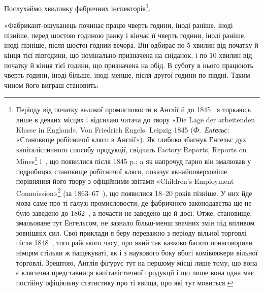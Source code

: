 Послухаймо хвилинку фабричних інспекторів\footnote{
Періоду від початку великої промисловости в Англії й до 1845~
я торкаюсь лише в деяких місцях і відсилаю читача до твору «Die Lage
der arbeitenden Klasse in England», Von Friedrich Engels. Leipzig 1845
(\emph{Ф.~Енґельс}: «Становище робітничої кляси в Англії»). Як глибоко збагнув
Енгельс дух капіталістичного способу продукції, свідчать Factory Reports,
Reports on Mines\footnote*{
— звіти фабричних інспекторів, звіти гірничих інспекторів. \emph{Ред.}
} і~, що появилися після 1845 p.; a як напрочуд
гарно він змалював у подробицях становище робітничої кляси,
показує якнайповерховіше порівняння його твору з офіційними звітами
«Children’s Employment Commission»\footnote*{
— комісії для вивчення праці дітей. \emph{Ред.}
} (за 1863--67~), що появилися
18--20 років пізніше. У них йде мова саме про ті галузі промисловости,
де фабричного законодавства ще не було заведено до 1862~, а почасти не
заведено ще й досі. Отже, становище, змальоване тут Енгельсом, не зазнало
більш-менш значних змін під впливом зовнішніх сил. Свої приклади
я беру переважно з періоду вільної торговлі після 1848~, того райського
часу, про який так казково багато понаговорили німцям стільки ж пащекуваті,
як і з наукового боку вбогі комівояжери вільної торговлі. Зрештою, Англія фігурує тут на першому
місці лише тому, що вона є клясична
представниця капіталістичної продукції і що лише вона одна має
постійну офіціяльну статистику про ті явища, про які тут мовиться.
}.

«Фабрикант-ошуканець починає працю чверть години, іноді
раніше, іноді пізніше, перед шостою годиною ранку і кінчає її
чверть години, іноді раніше, іноді пізніше, після шостої годнии
вечора. Він одбирає по 5 хвилин від початку й кінця тієї півгодини,
що номінально призначена на сніданок, і по 10 хвилин від
початку й кінця тієї години, що призначена на обід. В суботу в
нього працюють чверть години, іноді більше, іноді менше, після
другої години по півдні. Таким чином його виграш становить:

